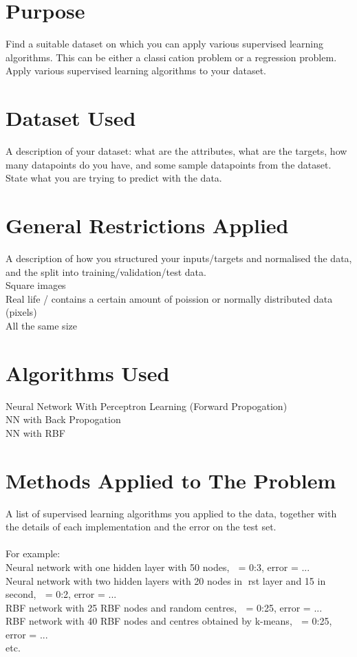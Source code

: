 \documentclass[11pt]{article}
\begin{document}
\begin{page}
\section{Purpose}
Find a suitable dataset on which you can apply various supervised learning algorithms.
This can be either a classication problem or a regression problem.
Apply various supervised learning algorithms to your dataset.

\section{Dataset Used}
A description of your dataset: what are the attributes, what are the targets, how many
datapoints do you have, and some sample datapoints from the dataset. State what you are
trying to predict with the data.\\

\section{General Restrictions Applied}
A description of how you structured your inputs/targets and normalised the data, and the
split into training/validation/test data.\\

Square images\\
Real life / contains a certain amount of poission or normally distributed data (pixels)\\
All the same size\\

\section{Algorithms Used}
Neural Network With Perceptron Learning (Forward Propogation)\\
NN with Back Propogation\\
NN with RBF\\

\section{Methods Applied to The Problem}
A list of supervised learning algorithms you applied to the data, together with the details
of each implementation and the error on the test set.\\\\
For example:\\
Neural network with one hidden layer with 50 nodes,  = 0:3, error = ...\\
Neural network with two hidden layers with 20 nodes in rst layer and 15 in second,  = 0:2,
error = ...\\
RBF network with 25 RBF nodes and random centres,  = 0:25, error = ...\\
RBF network with 40 RBF nodes and centres obtained by k-means,  = 0:25, error = ...\\
etc.\\


\end{page}
\end{document}
